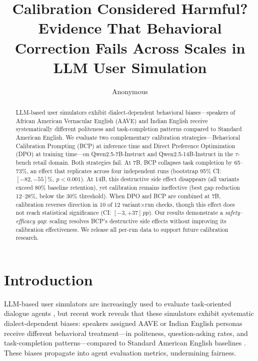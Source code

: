 \documentclass[11pt,a4paper]{article}
\title{Calibration Considered Harmful? Evidence That Behavioral Correction Fails Across Scales in LLM User Simulation}
\author{Anonymous}
\date{}
\newcommand{\taubench}{$\tau$-bench}
\newcommand{\pp}{\,pp}
\begin{document}
\maketitle

\begin{abstract}
LLM-based user simulators exhibit dialect-dependent behavioral biases---speakers of African American Vernacular English (AAVE) and Indian English receive systematically different politeness and task-completion patterns compared to Standard American English.
We evaluate two complementary calibration strategies---Behavioral Calibration Prompting (BCP) at inference time and Direct Preference Optimization (DPO) at training time---on Qwen2.5-7B-Instruct and Qwen2.5-14B-Instruct in the \taubench{} retail domain.
Both strategies fail.
At 7B, BCP collapses task completion by 65--73\%, an effect that replicates across four independent runs (bootstrap 95\% CI: $[-82, -55]\%$, $p < 0.001$).
At 14B, this destructive side effect disappears (all variants exceed 80\% baseline retention), yet calibration remains ineffective (best gap reduction 12--28\%, below the 30\% threshold).
When DPO and BCP are combined at 7B, calibration reverses direction in 10 of 12 variant$\times$run checks, though this effect does not reach statistical significance (CI: $[-3, +37]\pp$).
Our results demonstrate a \emph{safety--efficacy gap}: scaling resolves BCP's destructive side effects without improving its calibration effectiveness.
We release all per-run data to support future calibration research.
\end{abstract}

\section{Introduction}
\label{sec:intro}

LLM-based user simulators are increasingly used to evaluate task-oriented dialogue agents \citep{yao2024taubench}, but recent work reveals that these simulators exhibit systematic dialect-dependent biases: speakers assigned AAVE or Indian English personas receive different behavioral treatment---in politeness, question-asking rates, and task-completion patterns---compared to Standard American English baselines \citep{seshadri2026lost, sim2real2026gap}.
These biases propagate into agent evaluation metrics, undermining fairness.
\end{document}
